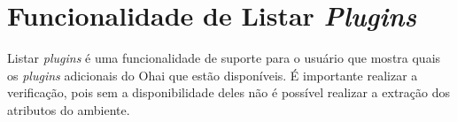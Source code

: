 \section{Funcionalidade de Listar \textit{Plugins}}
\label{sec:list}

Listar \textit{plugins} é uma funcionalidade de suporte para o usuário
que mostra quais os \textit{plugins} adicionais do Ohai que estão
disponíveis. É importante realizar a verificação, pois
sem a disponibilidade deles não é possível realizar a extração
dos atributos do ambiente.

